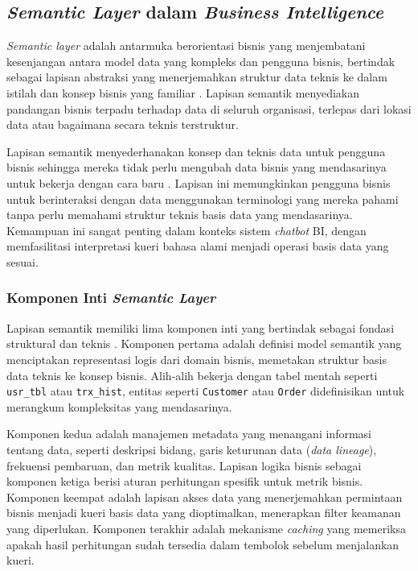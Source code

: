 \subsection{\textit{Semantic Layer} dalam \textit{Business Intelligence}}

\textit{Semantic layer} adalah antarmuka berorientasi bisnis yang menjembatani kesenjangan antara model data yang kompleks dan pengguna bisnis, bertindak sebagai lapisan abstraksi yang menerjemahkan struktur data teknis ke dalam istilah dan konsep bisnis yang familiar \autocite{databricks2025semantic}. Lapisan semantik menyediakan pandangan bisnis terpadu terhadap data di seluruh organisasi, terlepas dari lokasi data atau bagaimana secara teknis terstruktur.

Lapisan semantik menyederhanakan konsep dan teknis data untuk pengguna bisnis sehingga mereka tidak perlu mengubah data bisnis yang mendasarinya untuk bekerja dengan cara baru \autocite{atscale2025semantic}. Lapisan ini memungkinkan pengguna bisnis untuk berinteraksi dengan data menggunakan terminologi yang mereka pahami tanpa perlu memahami struktur teknis basis data yang mendasarinya. Kemampuan ini sangat penting dalam konteks sistem \textit{chatbot} BI, dengan memfasilitasi interpretasi kueri bahasa alami menjadi operasi basis data yang sesuai.

\subsubsection{Komponen Inti \textit{Semantic Layer}}

Lapisan semantik memiliki lima komponen inti yang bertindak sebagai fondasi struktural dan teknis \autocite{dbt2024semantic}. Komponen pertama adalah definisi model semantik yang menciptakan representasi logis dari domain bisnis, memetakan struktur basis data teknis ke konsep bisnis. Alih-alih bekerja dengan tabel mentah seperti \texttt{usr\_tbl} atau \texttt{trx\_hist}, entitas seperti \texttt{Customer} atau \texttt{Order} didefinisikan untuk merangkum kompleksitas yang mendasarinya.

Komponen kedua adalah manajemen metadata yang menangani informasi tentang data, seperti deskripsi bidang, garis keturunan data (\textit{data lineage}), frekuensi pembaruan, dan metrik kualitas. Lapisan logika bisnis sebagai komponen ketiga berisi aturan perhitungan spesifik untuk metrik bisnis. Komponen keempat adalah lapisan akses data yang menerjemahkan permintaan bisnis menjadi kueri basis data yang dioptimalkan, menerapkan filter keamanan yang diperlukan. Komponen terakhir adalah mekanisme \textit{caching} yang memeriksa apakah hasil perhitungan sudah tersedia dalam tembolok sebelum menjalankan kueri.

